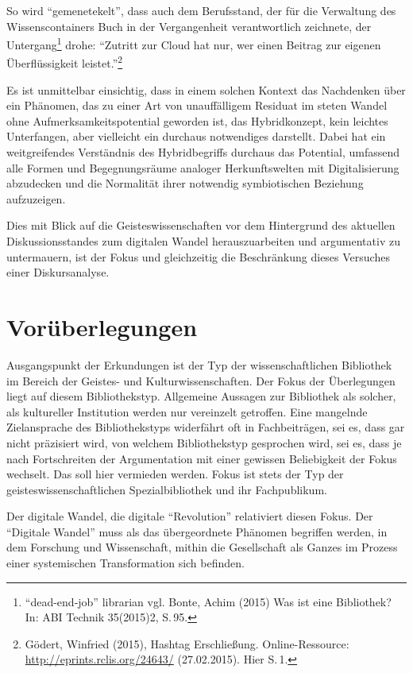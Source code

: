 \documentclass[a4paper,
fontsize=11pt,
oneside,
numbers=noperiodatend,
parskip=half-,
bibliography=totoc,
final
]{scrartcl}
\begin{document}
So wird \enquote{gemenetekelt}, dass auch dem Berufsstand, der für die
Verwaltung des Wissenscontainers Buch in der Vergangenheit
verantwortlich zeichnete, der Untergang\footnote{\enquote{dead-end-job}
  librarian vgl. Bonte, Achim (2015) Was ist eine Bibliothek? In: ABI
  Technik 35(2015)2, S.\,95.} drohe: \enquote{Zutritt zur Cloud hat nur,
wer einen Beitrag zur eigenen Überflüssigkeit leistet.}\footnote{Gödert,
  Winfried (2015), Hashtag Erschließung. Online-Ressource:
  \url{http://eprints.rclis.org/24643/} (27.02.2015). Hier S.\,1.}

Es ist unmittelbar einsichtig, dass in einem solchen Kontext das
Nachdenken über ein Phänomen, das zu einer Art von unauffälligem
Residuat im steten Wandel ohne Aufmerksamkeitspotential geworden ist,
das Hybridkonzept, kein leichtes Unterfangen, aber vielleicht ein
durchaus notwendiges darstellt. Dabei hat ein weitgreifendes Verständnis
des Hybridbegriffs durchaus das Potential, umfassend alle Formen und
Begegnungsräume analoger Herkunftswelten mit Digitalisierung abzudecken
und die Normalität ihrer notwendig symbiotischen Beziehung aufzuzeigen.

Dies mit Blick auf die Geisteswissenschaften vor dem Hintergrund des
aktuellen Diskussionsstandes zum digitalen Wandel herauszuarbeiten und
argumentativ zu untermauern, ist der Fokus und gleichzeitig die
Beschränkung dieses Versuches einer Diskursanalyse.

\section*{Vorüberlegungen}\label{voruxfcberlegungen}

Ausgangspunkt der Erkundungen ist der Typ der wissenschaftlichen
Bibliothek im Bereich der Geistes- und Kulturwissenschaften. Der Fokus
der Überlegungen liegt auf diesem Bibliothekstyp. Allgemeine Aussagen
zur Bibliothek als solcher, als kultureller Institution werden nur
vereinzelt getroffen. Eine mangelnde Zielansprache des Bibliothekstyps
widerfährt oft in Fachbeiträgen, sei es, dass gar nicht präzisiert wird,
von welchem Bibliothekstyp gesprochen wird, sei es, dass je nach
Fortschreiten der Argumentation mit einer gewissen Beliebigkeit der
Fokus wechselt. Das soll hier vermieden werden. Fokus ist stets der Typ
der geisteswissenschaftlichen Spezialbibliothek und ihr Fachpublikum.

Der digitale Wandel, die digitale \enquote{Revolution} relativiert
diesen Fokus. Der \enquote{Digitale Wandel} muss als das übergeordnete
Phänomen begriffen werden, in dem Forschung und Wissenschaft, mithin die
Gesellschaft als Ganzes im Prozess einer systemischen Transformation
sich befinden.
\end{document}
